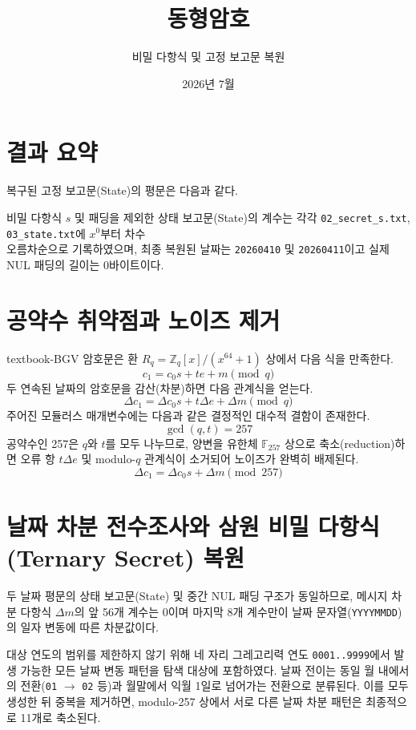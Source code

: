 \documentclass[10pt,a4paper]{article}
\title{동형암호}
\author{비밀 다항식 및 고정 보고문 복원}
\date{2026년 7월}
\begin{document}
\maketitle

\section*{결과 요약}

복구된 고정 보고문(State)의 평문은 다음과 같다.
\begin{center}
\end{center}

비밀 다항식 $s$ 및 패딩을 제외한 상태 보고문(State)의 계수는 각각 \texttt{02\_secret\_s.txt}, \texttt{03\_state.txt}에 $x^0$부터 차수 \\
오름차순으로 기록하였으며, 최종 복원된 날짜는 \texttt{20260410} 및 \texttt{20260411}이고 실제 NUL 패딩의 길이는 0바이트이다.

\section{공약수 취약점과 노이즈 제거}

textbook-BGV 암호문은 환 $R_q=\mathbb Z_q[x]/(x^{64}+1)$ 상에서 다음 식을 만족한다.
\[
  c_1=c_0s+te+m\pmod q
\]
두 연속된 날짜의 암호문을 감산(차분)하면 다음 관계식을 얻는다.
\[
  \Delta c_1=\Delta c_0s+t\Delta e+\Delta m\pmod q
\]
주어진 모듈러스 매개변수에는 다음과 같은 결정적인 대수적 결함이 존재한다.
\[
  \boxed{\gcd(q,t)=257}
\]
공약수인 257은 $q$와 $t$를 모두 나누므로, 양변을 유한체 $\mathbb F_{257}$ 상으로 축소(reduction)하면 오류 항 $t\Delta e$ 및 modulo-$q$ 관계식이 소거되어 노이즈가 완벽히 배제된다.
\[
  \boxed{\Delta c_1=\Delta c_0s+\Delta m\pmod {257}}
\]

\section{날짜 차분 전수조사와 삼원 비밀 다항식 (Ternary Secret) 복원}

두 날짜 평문의 상태 보고문(State) 및 중간 NUL 패딩 구조가 동일하므로, 메시지 차분 다항식 $\Delta m$의 앞 56개 계수는 0이며 마지막 8개 계수만이 날짜 문자열(\texttt{YYYYMMDD})의 일자 변동에 따른 차분값이다.

대상 연도의 범위를 제한하지 않기 위해 네 자리 그레고리력 연도 \texttt{0001..9999}에서 발생 가능한 모든 날짜 변동 패턴을 탐색 대상에 포함하였다. 날짜 전이는 동일 월 내에서의 전환(\texttt{01} $\to$ \texttt{02} 등)과 월말에서 익월 1일로 넘어가는 전환으로 분류된다. 이를 모두 생성한 뒤 중복을 제거하면, modulo-257 상에서 서로 다른 날짜 차분 패턴은 최종적으로 11개로 축소된다.
\end{document}

